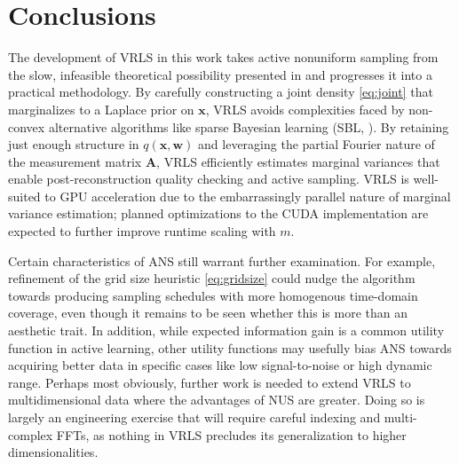 \documentclass[final,5p,times,twocolumn]{elsarticle}
\newcommand{\m}[1]{\boldsymbol{#1}}
\begin{document}
\section{Conclusions}
\label{sec:concl}
The development of VRLS in this work takes active nonuniform sampling from
the slow, infeasible theoretical possibility presented in
\cite{worley:cmr2018} and progresses it into a practical methodology.
By carefully constructing a joint density \eqref{eq:joint} that
marginalizes to a Laplace prior on $\m{x}$, VRLS avoids complexities
faced by non-convex alternative algorithms like sparse Bayesian learning
(SBL, \cite{worley:ieeetsp2019}). By retaining just enough structure
in $q(\m{x}, \m{w})$ and leveraging the partial Fourier nature of the
measurement matrix $\m{A}$, VRLS efficiently estimates marginal variances
that enable post-reconstruction quality checking and active sampling.
VRLS is well-suited to GPU acceleration due to the embarrassingly parallel
nature of marginal variance estimation; planned optimizations to the CUDA
implementation are expected to further improve runtime scaling with $m$.

Certain characteristics of ANS still warrant further examination.
For example, refinement of the grid size heuristic \eqref{eq:gridsize}
could nudge the algorithm towards producing sampling schedules with more
homogenous time-domain coverage, even though it remains to be seen whether
this is more than an aesthetic trait. In addition, while expected
information gain is a common utility function in active learning,
other utility functions may usefully bias ANS towards acquiring better
data in specific cases like low signal-to-noise or high dynamic range.
Perhaps most obviously, further work is needed to extend VRLS to
multidimensional data where the advantages of NUS are greater. Doing so
is largely an engineering exercise that will require careful indexing
and multi-complex FFTs, as nothing in VRLS precludes its generalization
to higher dimensionalities.
\end{document}
